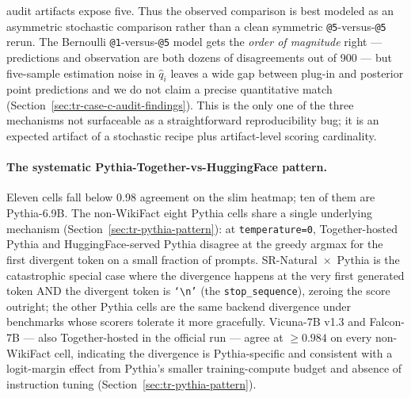\documentclass[11pt]{article}
\begin{document}
\begin{enumerate}
        audit artifacts expose five.  Thus the observed comparison is
        best modeled as an asymmetric stochastic comparison rather than
        a clean symmetric \texttt{@5}-versus-\texttt{@5} rerun.  The
        Bernoulli \texttt{@1}-versus-\texttt{@5} model gets the
        \emph{order of magnitude} right --- predictions and
        observation are both dozens of disagreements out of 900
        --- but five-sample estimation noise in $\hat q_i$ leaves a
        wide gap between plug-in and posterior point predictions
        and we do not claim a precise quantitative match
        (Section~\ref{sec:tr-case-c-audit-findings}).
        This is the only one of the three mechanisms not surfaceable as
        a straightforward reproducibility bug; it is an expected
        artifact of a stochastic recipe plus artifact-level scoring
        cardinality.

\end{enumerate}

\paragraph{The systematic Pythia-Together-vs-HuggingFace pattern.}
Eleven cells fall below 0.98 agreement on the slim heatmap; ten of
  them are Pythia-6.9B.
The non-WikiFact eight Pythia cells share a single underlying
  mechanism (Section~\ref{sec:tr-pythia-pattern}): at
  \texttt{temperature=0}, Together-hosted Pythia and HuggingFace-served
  Pythia disagree at the greedy argmax for the first divergent token
  on a small fraction of prompts.
SR-Natural~$\times$~Pythia is the catastrophic special case where the
  divergence happens at the very first generated token AND the
  divergent token is \texttt{`\textbackslash n'} (the
  \texttt{stop\_sequence}), zeroing the score outright; the other
  Pythia cells are the same backend divergence under benchmarks whose
  scorers tolerate it more gracefully.
Vicuna-7B v1.3 and Falcon-7B --- also Together-hosted in the official
  run --- agree at $\geq 0.984$ on every non-WikiFact cell, indicating
  the divergence is Pythia-specific and consistent with a logit-margin
  effect from Pythia's smaller training-compute budget and absence of
  instruction tuning (Section~\ref{sec:tr-pythia-pattern}).
\end{document}
